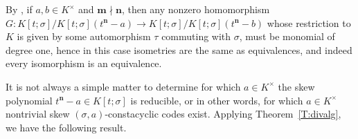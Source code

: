 \documentclass[11pt]{amsart}
\theoremstyle{plain}
\newtheorem*{theorem*}{Theorem}
\theoremstyle{definition}
\numberwithin{equation}{section}
\numberwithin{figure}{section}
\newcommand{\field}{K}
\newcommand{\Kone}[1]{K[t;\sigma]/K[t;\sigma](t^{\de}-#1)}
\newcommand{\os}{{\mathbf{m}}}  %
\newcommand{\de}{{\mathbf{n}}}  %
\begin{document}

By \cite[Corollary 6.2]{NevinsPumpluen2025submitted}, if   $a,b\in K^\times$ and $\os \nmid\de$, then any nonzero homomorphism
 $G:K[t;\sigma]/K[t;\sigma](t^\de-a) \to K[t;\sigma]/K[t;\sigma](t^\de-b)$  whose restriction to $K$ is given by some automorphism $\tau$ commuting with $\sigma$, must be monomial of degree one, hence in this case isometries are the same as equivalences, and indeed every isomorphism is an equivalence.



It is not always a simple matter to determine for which $a\in K^\times$ the skew polynomial $t^\de-a\in K[t;\sigma]$ is reducible, or in other words, for which $a\in K^\times$ nontrivial skew $(\sigma,a)$-constacyclic codes exist.  Applying Theorem~\ref{T:divalg}, we have the following result. %
\end{document}

